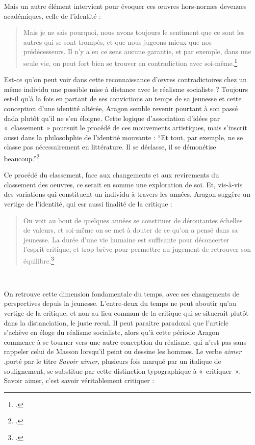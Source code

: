  Mais un autre élément intervient pour évoquer ces \oe{}uvres hors-normes devenues académiques, celle de l’identité :  
 \begin{quote}
  Mais je ne sais pourquoi, nous avons toujours le sentiment que ce sont les autres qui se sont trompés, et que nous jugeons mieux que nos prédécesseurs. Il n’y a en ce sens aucune garantie, et par exemple, dans une seule vie, on peut fort bien se trouver en contradiction avec soi-même.\footcite{savoiraimer}\end{quote}

	Est-ce qu’on peut voir dans cette reconnaissance d’\oe{}vres contradictoires chez un même individu une possible mise à distance avec le réalisme socialiste ? Toujours est-il qu’à la fois en partant de ses convictions au temps de sa jeunesse et cette conception d’une identité altérée, Aragon semble revenir pourtant à son passé dada plutôt qu’il ne s’en éloigne. Cette logique d'association d'idées par  « classement » poursuit le procédé de ces mouvements artistiques, mais s'inscrit aussi dans la philosohphie de l'identité mouvante : \enquote{Et tout, par exemple, ne se classe pas nécessairement en littérature. Il se déclasse, il se démonétise beaucoup.}\footcite{savoiraimer}

Ce procédé du classement, face aux changements et aux revirements du  classement des oeuvres, ce serait en somme une exploration de soi. Et, vis-à-vis des variations qui constituent un individu à travers les années,  Aragon suggère un vertige de l’identité, qui esr aussi finalité de la critique : 

\begin{quote}
 On voit au bout de quelques années se constituer de déroutantes échelles de valeurs, et soi-même on se met à douter de ce qu’on a pensé dans sa jeunesse. La durée d’une vie humaine est suffisante pour déconcerter l’esprit critique, et trop brève pour permettre au jugement de retrouver son équilibre.\footcite{savoiraimer}   
\end{quote}
 

	 On retrouve cette dimension fondamentale du temps, avec ses changements de perspectives depuis la jeunesse. L’entre-deux du temps ne peut aboutir qu’au vertige de la critique, et non au lieu commun de la critique qui se situerait plutôt dans la distanciation, le juste recul. Il peut paraitre paradoxal que l’article s’achève en éloge du réalisme socialiste, alors qu’à cette période Aragon commence à se tourner vers une autre conception du réalisme, qui n’est pas sans rappeler celui de Masson lorsqu’il peint ou dessine les hommes. Le verbe \emph{aimer} ,porté par le titre \emph{Savoir aimer},  plusieurs fois marqué par un italique de soulignement, se substitue par cette distinction typographique à « critiquer ». Savoir aimer, c’est savoir véritablement critiquer :  


